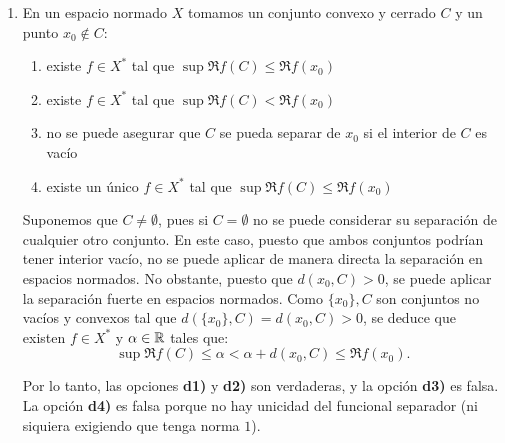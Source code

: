 \documentclass[12pt]{article}
\begin{document}
\begin{ejercicio}
\begin{enumerate}[label=\alph*)]
            Por tanto, si $\|\cdot\|_1$ y $\|\cdot\|_\infty$ fueran equivalentes, existiría una constante $C > 0$ tal que:
            \begin{equation*}
                n = \|x_n\|_1 \leq C \|x_n\|_\infty = C \quad \forall n \in \bb{N}.
            \end{equation*}

            Esto es imposible, por lo que se concluye que $\|\cdot\|_1$ y $\|\cdot\|_\infty$ no son equivalentes en $Y$. Por lo tanto, la única afirmación verdadera es la \textbf{c2)}.

            \item En un espacio normado $X$ tomamos un conjunto convexo y cerrado $C$ y un punto $x_0 \notin C$:
            \begin{enumerate}[label={d\arabic*)}]
                \item existe $f \in X^*$ tal que $\sup \Re f(C) \leq \Re f(x_0)$
                \item existe $f \in X^*$ tal que $\sup \Re f(C) < \Re f(x_0)$
                \item no se puede asegurar que $C$ se pueda separar de $x_0$ si el interior de $C$ es vacío
                \item existe un único $f \in X^*$ tal que $\sup \Re f(C) \leq \Re f(x_0)$
            \end{enumerate}

            Suponemos que $C\neq \emptyset$, pues si $C=\emptyset$ no se puede considerar su separación de cualquier otro conjunto. En este caso, puesto que ambos conjuntos podrían tener interior vacío, no se puede aplicar de manera directa la separación en espacios normados. No obstante, puesto que $d(x_0, C) > 0$, se puede aplicar la separación fuerte en espacios normados. Como $\{x_0\},C$ son conjuntos no vacíos y convexos tal que $d(\{x_0\}, C) = d(x_0, C) > 0$, se deduce que existen $f \in X^*$ y $\alpha \in \mathbb{R}$ tales que:
            \begin{equation*}
                \sup \Re f(C) \leq  \alpha<\alpha + d(x_0, C) \leq \Re f(x_0).
            \end{equation*}

            Por lo tanto, las opciones \textbf{d1)} y \textbf{d2)} son verdaderas, y la opción \textbf{d3)} es falsa. La opción \textbf{d4)} es falsa porque no hay unicidad del funcional separador (ni siquiera exigiendo que tenga norma $1$). 


\end{enumerate}
\end{ejercicio}
\end{document}
